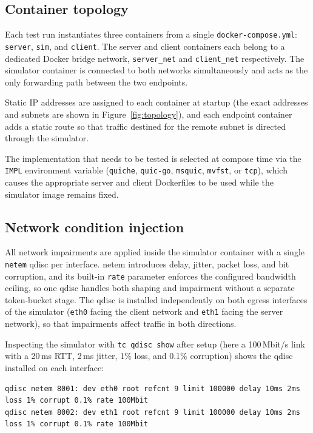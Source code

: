 \subsection{Container topology}
\label{subsec:topology}

Each test run instantiates three containers from a single
\texttt{docker-compose.yml}: \texttt{server}, \texttt{sim}, and
\texttt{client}. The server and client containers each belong to a dedicated
Docker bridge network, \texttt{server\_net} and \texttt{client\_net}
respectively. The simulator container is connected to both networks
simultaneously and acts as the only forwarding path between the two endpoints.

Static IP addresses are assigned to each container at startup (the exact
addresses and subnets are shown in Figure~\ref{fig:topology}), and each
endpoint container adds a static route so that traffic destined for the remote
subnet is directed through the simulator.

The implementation that needs to be tested is selected at compose time via
the \texttt{IMPL} environment variable (\texttt{quiche}, \texttt{quic-go},
\texttt{msquic}, \texttt{mvfst}, or \texttt{tcp}), which causes the appropriate
server and client Dockerfiles to be used while the simulator image remains fixed.

\subsection{Network condition injection}
\label{subsec:netem}

All network impairments are applied inside the simulator container with a
single \texttt{netem} qdisc per interface. netem introduces delay, jitter,
packet loss, and bit corruption, and its built-in \texttt{rate} parameter
enforces the configured bandwidth ceiling, so one qdisc handles both shaping and
impairment without a separate token-bucket stage. The qdisc is installed
independently on both egress interfaces of the simulator (\texttt{eth0} facing
the client network and \texttt{eth1} facing the server network), so that
impairments affect traffic in both directions.

Inspecting the simulator with \texttt{tc qdisc show} after setup (here a
100\,Mbit/s link with a 20\,ms RTT, 2\,ms jitter, 1\% loss, and 0.1\%
corruption) shows the qdisc installed on each interface:

\begin{lstlisting}[numbers=none,breaklines=true,basicstyle=\footnotesize\ttfamily]
qdisc netem 8001: dev eth0 root refcnt 9 limit 100000 delay 10ms 2ms loss 1% corrupt 0.1% rate 100Mbit
qdisc netem 8002: dev eth1 root refcnt 9 limit 100000 delay 10ms 2ms loss 1% corrupt 0.1% rate 100Mbit
\end{lstlisting}

